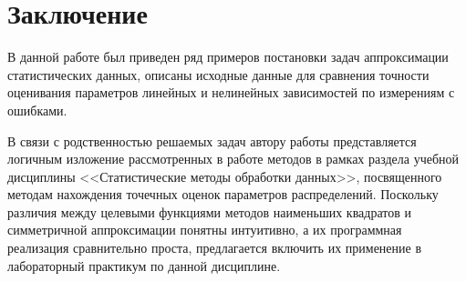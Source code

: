 \chapter*{Заключение}

В данной работе был приведен ряд примеров постановки задач
аппроксимации статистических данных,
описаны исходные данные для сравнения точности оценивания параметров
линейных и нелинейных зависимостей по измерениям с ошибками.

В связи с родственностью решаемых задач автору работы представляется логичным
изложение рассмотренных в работе методов в
рамках раздела учебной дисциплины <<Статистические методы обработки данных>>,
посвященного методам нахождения точечных оценок параметров распределений.
Поскольку различия между целевыми функциями методов наименьших квадратов и
симметричной аппроксимации понятны интуитивно,
а их программная реализация сравнительно проста,
предлагается включить их применение в лабораторный практикум по данной дисциплине.